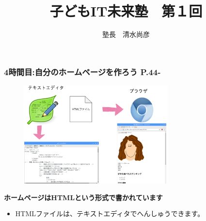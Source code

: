 \documentclass[dvipdfmx]{beamer}
\title{子どもIT未来塾　第１回}
\author{塾長　清水尚彦}
\begin{document}



\begin{frame}[fragile]
	\frametitle{4時間目:自分のホームページを作ろう P.44-~~~}
    \begin{figure}
      \centering
      \includegraphics[width=0.7\textwidth]{slide04_001.png}\\
    \end{figure}
    \large\textbf{ホームページはHTMLという形式で書かれています}
        \begin{itemize}
          \item HTMLファイルは、テキストエディタでへんしゅうできます。
        \end{itemize}
\end{frame}
\end{document}
